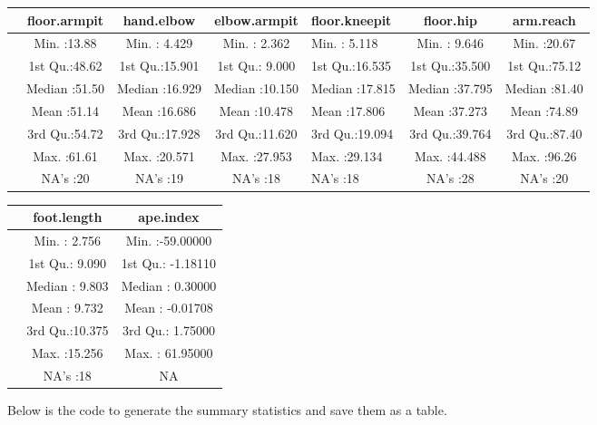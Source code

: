 \documentclass[]{article}
\begin{document}
\begin{longtable}[]{@{}lccclcc@{}}
\toprule
& floor.armpit & hand.elbow & elbow.armpit & floor.kneepit & floor.hip &
arm.reach\tabularnewline
\midrule
\endhead
& Min. :13.88 & Min. : 4.429 & Min. : 2.362 & Min. : 5.118 & Min. :
9.646 & Min. :20.67\tabularnewline
& 1st Qu.:48.62 & 1st Qu.:15.901 & 1st Qu.: 9.000 & 1st Qu.:16.535 & 1st
Qu.:35.500 & 1st Qu.:75.12\tabularnewline
& Median :51.50 & Median :16.929 & Median :10.150 & Median :17.815 &
Median :37.795 & Median :81.40\tabularnewline
& Mean :51.14 & Mean :16.686 & Mean :10.478 & Mean :17.806 & Mean
:37.273 & Mean :74.89\tabularnewline
& 3rd Qu.:54.72 & 3rd Qu.:17.928 & 3rd Qu.:11.620 & 3rd Qu.:19.094 & 3rd
Qu.:39.764 & 3rd Qu.:87.40\tabularnewline
& Max. :61.61 & Max. :20.571 & Max. :27.953 & Max. :29.134 & Max.
:44.488 & Max. :96.26\tabularnewline
& NA's :20 & NA's :19 & NA's :18 & NA's :18 & NA's :28 & NA's
:20\tabularnewline
\bottomrule
\end{longtable}

\begin{longtable}[]{@{}lcc@{}}
\toprule
& foot.length & ape.index\tabularnewline
\midrule
\endhead
& Min. : 2.756 & Min. :-59.00000\tabularnewline
& 1st Qu.: 9.090 & 1st Qu.: -1.18110\tabularnewline
& Median : 9.803 & Median : 0.30000\tabularnewline
& Mean : 9.732 & Mean : -0.01708\tabularnewline
& 3rd Qu.:10.375 & 3rd Qu.: 1.75000\tabularnewline
& Max. :15.256 & Max. : 61.95000\tabularnewline
& NA's :18 & NA\tabularnewline
\bottomrule
\end{longtable}

Below is the code to generate the summary statistics and save them as a
table.
\end{document}

